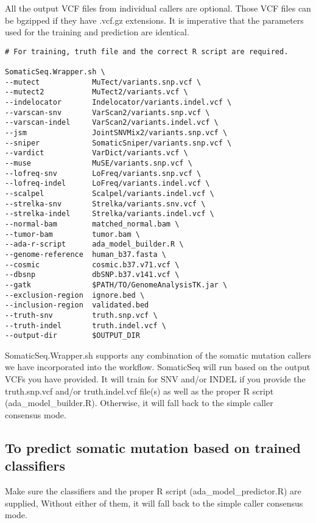 \documentclass[10pt,letterpaper]{article}
\begin{document}
\begin{sloppypar}
All the output VCF files from individual callers are optional. Those VCF files can be bgzipped if they have .vcf.gz extensions. It is imperative that the parameters used for the training and prediction are identical. 


\begin{lstlisting}
# For training, truth file and the correct R script are required.

SomaticSeq.Wrapper.sh \
--mutect            MuTect/variants.snp.vcf \
--mutect2           MuTect2/variants.vcf \
--indelocator       Indelocator/variants.indel.vcf \
--varscan-snv       VarScan2/variants.snp.vcf \
--varscan-indel     VarScan2/variants.indel.vcf \
--jsm               JointSNVMix2/variants.snp.vcf \
--sniper            SomaticSniper/variants.snp.vcf \
--vardict           VarDict/variants.vcf \
--muse              MuSE/variants.snp.vcf \
--lofreq-snv        LoFreq/variants.snp.vcf \
--lofreq-indel      LoFreq/variants.indel.vcf \
--scalpel           Scalpel/variants.indel.vcf \
--strelka-snv       Strelka/variants.snv.vcf \
--strelka-indel     Strelka/variants.indel.vcf \
--normal-bam        matched_normal.bam \
--tumor-bam         tumor.bam \
--ada-r-script      ada_model_builder.R \
--genome-reference  human_b37.fasta \
--cosmic            cosmic.b37.v71.vcf \
--dbsnp             dbSNP.b37.v141.vcf \
--gatk              $PATH/TO/GenomeAnalysisTK.jar \
--exclusion-region  ignore.bed \
--inclusion-region  validated.bed
--truth-snv         truth.snp.vcf \
--truth-indel       truth.indel.vcf \
--output-dir        $OUTPUT_DIR
\end{lstlisting}

SomaticSeq.Wrapper.sh supports any combination of the somatic mutation callers we have incorporated into the workflow. SomaticSeq will run based on the output VCFs you have provided. It will train for SNV and/or INDEL if you provide the truth.snp.vcf and/or truth.indel.vcf file(s) as well as the proper R script (ada\_model\_builder.R). Otherwise, it will fall back to the simple caller consensus mode.




\subsection{To predict somatic mutation based on trained classifiers}

Make sure the classifiers and the proper R script (ada\_model\_predictor.R) are supplied, Without either of them, it will fall back to the simple caller consensus mode.



\end{sloppypar}
\end{document}
